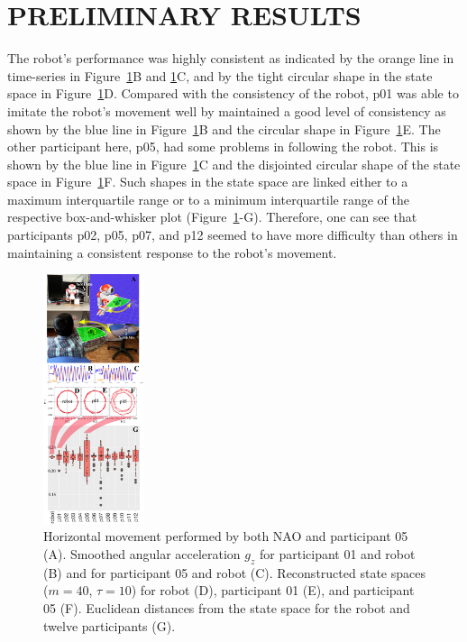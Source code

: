 \documentclass{sig-alternate-05-2015}
\begin{document}
\section{PRELIMINARY RESULTS}

The robot's performance was highly consistent 
as indicated by the orange line in time-series in Figure~\ref{fig:main}B and \ref{fig:main}C,
and by the tight circular shape in the state space in Figure~\ref{fig:main}D.
Compared with the consistency of the robot, 
p01 was able to imitate the robot's movement well
by maintained a good level of consistency
as shown by the blue line in Figure~\ref{fig:main}B and 
the circular shape in Figure~\ref{fig:main}E.
The other participant here, p05, had some problems in following the robot.
This is shown by the blue line in 
Figure~\ref{fig:main}C and the disjointed circular shape 
of the  state space in Figure~\ref{fig:main}F.
Such shapes in the  state space are linked either 
to a maximum interquartile range
or 
to a minimum interquartile range of the respective box-and-whisker plot (Figure~\ref{fig:main}-G).
Therefore, one  can see that participants p02, p05, p07, and p12 seemed
to have more difficulty than others in maintaining a consistent response
to the robot's movement.


\begin{figure}[ht]
\centering
\includegraphics[width=0.265\textwidth]{fig06}
\caption{
Horizontal movement performed by both NAO and participant 05 (A). 
Smoothed angular acceleration $g_z$ for participant 01  and robot (B)
and for participant 05 and robot (C).
Reconstructed state spaces  ($m=40$, $\tau=10$) for robot (D), participant 01 (E), and participant 05 (F).
Euclidean distances from the state space for the robot and twelve participants (G).
}
\label{fig:main}
\end{figure}
\end{document}
